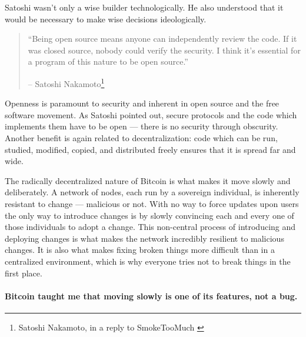 Satoshi wasn't only a wise builder technologically. He also understood
that it would be necessary to make wise decisions ideologically.

\begin{quotation}\begin{samepage}
\enquote{Being open source means anyone can independently review the code. If
it was closed source, nobody could verify the security. I think it's
essential for a program of this nature to be open source.}
\begin{flushright} -- Satoshi Nakamoto\footnote{Satoshi Nakamoto, in a reply to SmokeTooMuch \cite{satoshi-open-source}}
\end{flushright}\end{samepage}\end{quotation}

Openness is paramount to security and inherent in open source and the
free software movement. As Satoshi pointed out, secure protocols and the
code which implements them have to be open --- there is no security
through obscurity. Another benefit is again related to decentralization:
code which can be run, studied, modified, copied, and distributed freely
ensures that it is spread far and wide.

The radically decentralized nature of Bitcoin is what makes it move
slowly and deliberately. A network of nodes, each run by a sovereign
individual, is inherently resistant to change --- malicious or not. With
no way to force updates upon users the only way to introduce changes is
by slowly convincing each and every one of those individuals to adopt a
change. This non-central process of introducing and deploying changes is
what makes the network incredibly resilient to malicious changes. It is
also what makes fixing broken things more difficult than in a
centralized environment, which is why everyone tries not to break things
in the first place.

\paragraph{Bitcoin taught me that moving slowly is one of its features, not a
bug.}

